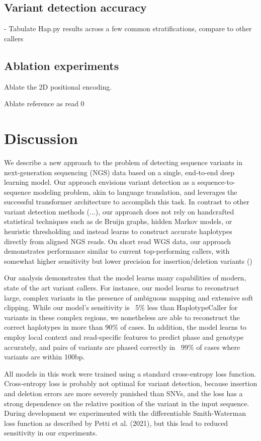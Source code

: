 \documentclass[]{article}
\begin{document}
 \subsection{Variant detection accuracy}

 - Tabulate Hap.py results across a few common stratifications, compare to other callers

\subsection{Ablation experiments}
 
 Ablate the 2D positional encoding.

 Ablate reference as read 0 
 
 


\section{Discussion}

We describe a new approach to the problem of detecting sequence variants in next-generation sequencing (NGS) data based on a single, end-to-end deep learning model. Our approach envisions variant detection as a sequence-to-sequence modeling problem, akin to language translation, and leverages the successful transformer architecture to accomplish this task. In contrast to other variant detection methods (...), our approach does not rely on handcrafted statistical techniques such as de Bruijn graphs, hidden Markov models, or heuristic thresholding and instead learns to construct accurate haplotypes directly from aligned NGS reads. On short read WGS data, our approach demonstrates performance similar to current top-performing callers, with somewhat higher sensitivity but lower precision for insertion/deletion variants ()

Our analysis demonstrates that the model learns many capabilities of modern, state of the art variant callers. For instance, our model learns to reconstruct large, complex variants in the presence of ambiguous mapping and extensive soft clipping. While our model's sensitivity is ~5\% less than HaplotypeCaller for variants in these complex regions, we nonetheless are able to reconstruct the correct haplotypes in more than 90\% of cases.   In addition, the model learns to employ local context and read-specific features to predict phase and genotype accurately, and pairs of variants are phased correctly in ~99\% of cases where variants are within 100bp.  

All models in this work were trained using a standard cross-entropy loss function.  Cross-entropy loss is probably not optimal for variant detection, because insertion and deletion errors are more severely punished than SNVs, and the loss has a strong dependence on the relative position of the variant in the input sequence.  During development we experimented with the differentiable Smith-Waterman loss function as described by Petti et al. (2021), but this lead to reduced sensitivity in our experiments. 
\end{document}

